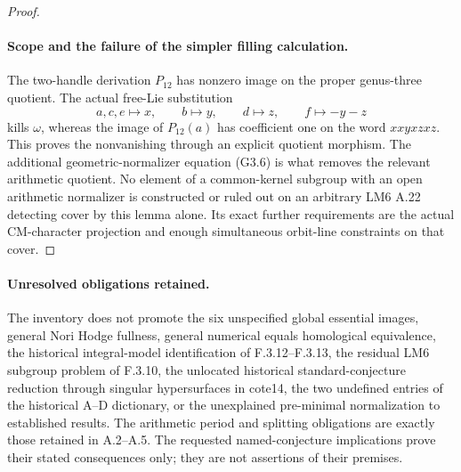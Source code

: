 \begin{proof}
\paragraph{Scope and the failure of the simpler filling calculation.}
The two-handle derivation $P_{12}$ has nonzero image on
the proper genus-three quotient. The actual free-Lie
substitution
\[
 a,c,e\mapsto x,\qquad b\mapsto y,\qquad d\mapsto z,
 \qquad f\mapsto-y-z
\]
kills $\omega$, whereas the image of $P_{12}(a)$ has
coefficient one on the word $xxyxzxz$. This proves the
nonvanishing through an explicit quotient morphism.
The additional geometric-normalizer equation (G3.6)
is what removes the relevant arithmetic quotient.
No element of a common-kernel subgroup with an open
arithmetic normalizer is constructed or ruled out on
an arbitrary LM6 A.22 detecting cover by this lemma
alone. Its exact further requirements are the actual
CM-character projection and enough simultaneous
orbit-line constraints on that cover.

\end{proof}

\paragraph{Unresolved obligations retained.}
The inventory does not promote the six unspecified global essential images, general Nori Hodge fullness, general numerical equals homological equivalence, the historical integral-model identification of F.3.12--F.3.13, the residual LM6 subgroup problem of F.3.10, the unlocated historical standard-conjecture reduction through singular hypersurfaces in cote14, the two undefined entries of the historical A--D dictionary, or the unexplained pre-minimal normalization to established results. The arithmetic period and splitting obligations are exactly those retained in A.2--A.5. The requested named-conjecture implications prove their stated consequences only; they are not assertions of their premises.


